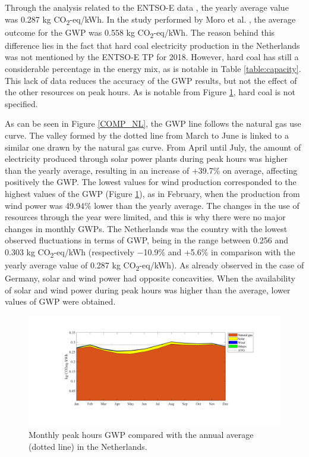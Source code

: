 { Through the analysis related to the ENTSO-E data \cite{Entso-eProduction}, the yearly average value was 0.287 kg CO\textsubscript2-eq/kWh. In the study performed by Moro et al. \cite{Moro2017}, the average outcome for the GWP was 0.558 kg CO\textsubscript2-eq/kWh. The reason behind this difference lies in the fact that hard coal electricity production in the Netherlands was not mentioned by the ENTSO-E TP for 2018. However, hard coal has still a considerable percentage in the energy mix, as is notable in Table \ref{table:capacity}. This lack of data reduces the accuracy of the GWP results, but not the effect of the other resources on peak hours. As is notable from Figure \ref{GWP_NL}, hard coal is not specified.  
 
 As can be seen in Figure \ref{COMP_NL}, the GWP line follows the natural gas use curve. The valley formed by the dotted line from March to June is linked to a similar one drawn by the natural gas curve. From April until July, the amount of electricity produced through solar power plants during peak hours was higher than the yearly average, resulting in an increase of {+39.7\% on average}, affecting positively the GWP. The lowest values for wind production corresponded to the highest values of the GWP (Figure \ref{GWP_NL}), {as in February, when the production from wind power was 49.94\% lower than the yearly average}. The changes in the use of  resources through the year were limited, and this is why there were no major changes in monthly GWPs. {The Netherlands was the country with the lowest observed fluctuations in terms of GWP, being in the range between 0.256 and 0.303 kg CO\textsubscript2-eq/kWh (respectively $-$10.9\% and +5.6\% in comparison with the yearly average value of 0.287 kg CO\textsubscript2-eq/kWh). As already observed in the case of Germany, solar and wind power had opposite concavities. When the availability of solar and wind power during peak hours was higher than the average, lower values of GWP were obtained.} 
 

\begin{figure}[]
	\centering
	\includegraphics[width=1\textwidth]{ChapterLCA/Images/GWP_plots/Netherlands_GWP.png}
	\vspace*{-17mm}
	\caption{Monthly peak hours GWP compared with the annual average (dotted line) in the Netherlands.}
	\label{GWP_NL}
\end{figure}
	
}
